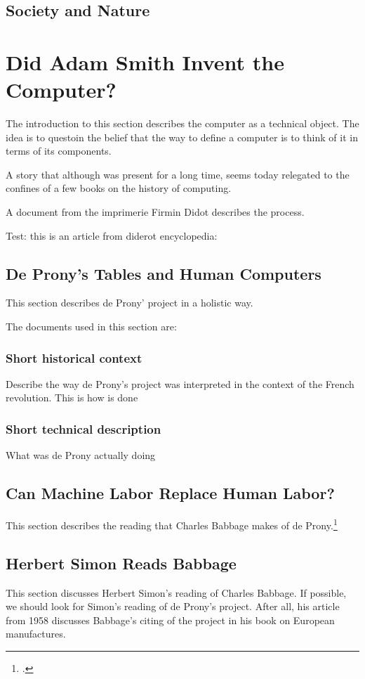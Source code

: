 \documentclass[version=last,draft=true,paper=A4,portrait,twoside=true,twocolumn=false,headinclude=false,footinclude=false,fontsize=12,BCOR=20mm,DIV=calc,pagesize=auto,titlepage=firstiscover,mpinclude=true,open=right,chapterprefix=true,numbers=autoendperiod,headsepline=false,parskip=false]{scrbook}
\begin{document}
\section{Society and Nature}
\label{sec:orgc1bf313}
\chapter{Did Adam Smith Invent the Computer?}
\label{sec:orgd9677b7}
The introduction to this section describes the computer as a technical
object. The idea is to questoin the belief that the way to define a
computer is to think of it in terms of its components. 

A story that although was present for a long time, seems today relegated to
the confines of a few books on the history of computing. 

A document from the imprimerie Firmin Didot describes the process.

Test: this is an article from diderot encyclopedia:

\section{De Prony's Tables and Human Computers}
\label{sec:org85e6235}
This section describes de Prony' project in a holistic way. 

The documents used in this section are:

\subsection{Short historical context}
\label{sec:org8c9dc0a}
Describe the way de Prony's project was interpreted in the context of the
French revolution. This is how is done 
\subsection{Short technical description}
\label{sec:orgc730024}
What was de Prony actually doing
\section{Can Machine Labor Replace Human Labor?}
\label{sec:org46af764}
This section describes the reading that Charles Babbage makes of de Prony.\footcite{babbage1832}

\section{Herbert Simon Reads Babbage}
\label{sec:orge775bf6}
This section discusses Herbert Simon's reading of Charles Babbage. If
possible, we should look for Simon's reading of de Prony's project. After
all, his article from 1958 discusses Babbage's citing of the project in his
book on European manufactures.
\end{document}
